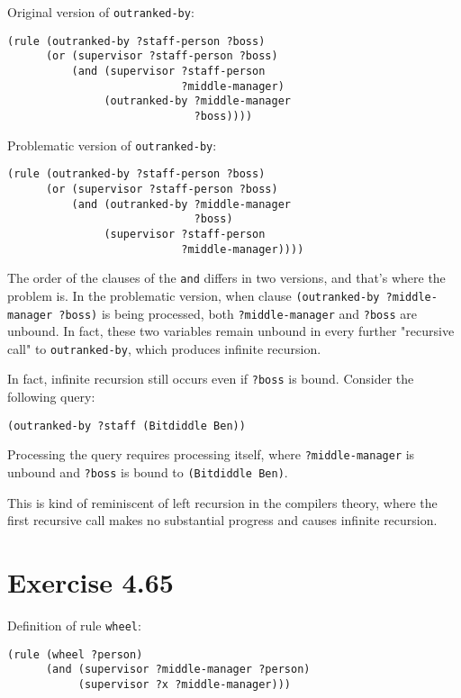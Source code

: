 \documentclass[../main.tex]{subfiles}
\begin{document}
Original version of \lstinline{outranked-by}:

\begin{lstlisting}
(rule (outranked-by ?staff-person ?boss)
      (or (supervisor ?staff-person ?boss)
          (and (supervisor ?staff-person
                           ?middle-manager)
               (outranked-by ?middle-manager
                             ?boss))))
\end{lstlisting}

Problematic version of \lstinline{outranked-by}:

\begin{lstlisting}
(rule (outranked-by ?staff-person ?boss)
      (or (supervisor ?staff-person ?boss)
          (and (outranked-by ?middle-manager
                             ?boss)
               (supervisor ?staff-person
                           ?middle-manager))))
\end{lstlisting}

The order of the clauses of the \lstinline{and} differs in two versions, and that's where the problem is. In the problematic version, when clause \lstinline{(outranked-by ?middle-manager ?boss)} is being processed, both \lstinline{?middle-manager} and \lstinline{?boss} are unbound. In fact, these two variables remain unbound in every further "recursive call" to \lstinline{outranked-by}, which produces infinite recursion.

In fact, infinite recursion still occurs even if \lstinline{?boss} is bound. Consider the following query:

\begin{lstlisting}
(outranked-by ?staff (Bitdiddle Ben))
\end{lstlisting}

Processing the query requires processing itself, where \lstinline{?middle-manager} is unbound and \lstinline{?boss} is bound to \lstinline{(Bitdiddle Ben)}.

This is kind of reminiscent of left recursion in the compilers theory, where the first recursive call makes no substantial progress and causes infinite recursion.

\section{Exercise 4.65}

Definition of rule \lstinline{wheel}:

\begin{lstlisting}
(rule (wheel ?person)
      (and (supervisor ?middle-manager ?person)
           (supervisor ?x ?middle-manager)))
\end{lstlisting}
\end{document}
